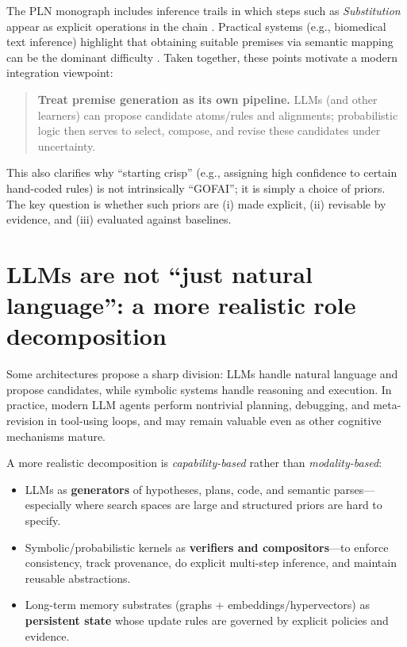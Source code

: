 \documentclass[11pt]{article}
\begin{document}
The PLN monograph includes inference trails in which steps such as \emph{Substitution} appear as explicit
operations in the chain \cite{pln-book}. Practical systems (e.g., biomedical text inference) highlight that
obtaining suitable premises via semantic mapping can be the dominant difficulty \cite{bioliterate-2006}.
Taken together, these points motivate a modern integration viewpoint:

\begin{quote}
\textbf{Treat premise generation as its own pipeline.}
LLMs (and other learners) can propose candidate atoms/rules and alignments; probabilistic logic then
serves to select, compose, and revise these candidates under uncertainty.
\end{quote}

This also clarifies why ``starting crisp'' (e.g., assigning high confidence to certain hand-coded rules)
is not intrinsically ``GOFAI''; it is simply a choice of priors.
The key question is whether such priors are (i) made explicit, (ii) revisable by evidence, and (iii)
evaluated against baselines.

\section{LLMs are not ``just natural language'': a more realistic role decomposition}

Some architectures propose a sharp division: LLMs handle natural language and propose candidates,
while symbolic systems handle reasoning and execution.
In practice, modern LLM agents perform nontrivial planning, debugging, and meta-revision in
tool-using loops, and may remain valuable even as other cognitive mechanisms mature.

A more realistic decomposition is \emph{capability-based} rather than \emph{modality-based}:

\begin{itemize}[leftmargin=*]
\item LLMs as \textbf{generators} of hypotheses, plans, code, and semantic parses---especially where
search spaces are large and structured priors are hard to specify.
\item Symbolic/probabilistic kernels as \textbf{verifiers and compositors}---to enforce consistency,
track provenance, do explicit multi-step inference, and maintain reusable abstractions.
\item Long-term memory substrates (graphs + embeddings/hypervectors) as \textbf{persistent state}
whose update rules are governed by explicit policies and evidence.
\end{itemize}
\end{document}
